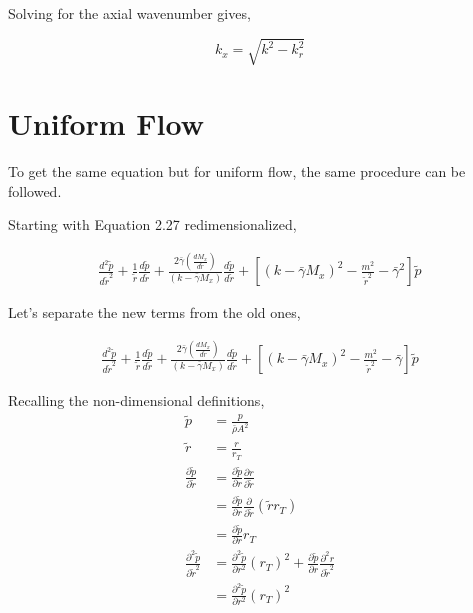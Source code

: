 \documentclass[a4paper]{article}
\begin{document}
Solving for the axial wavenumber gives,

\begin{equation}
    k_x = \sqrt{k^2 - k_r^2}
    \label{eqn:axial_wavenumber_equation}
\end{equation}

\section{Uniform Flow}

To get the same equation but for uniform flow, the same procedure can be followed.

Starting with Equation 2.27 redimensionalized, 

\begin{align*}
    \frac{ d^2 \tilde{p}}{d \tilde{r}^2} +
    \frac{1}{\tilde{r}} 
    \frac{d \tilde{p}}{d \tilde{r}} + 
    \frac{2 \bar{\gamma} \left( \frac{d M_x}{d \tilde{r}} \right)}
    {\left( k - \bar{\gamma} M_x \right)}\frac{d \tilde{p}}{d \tilde{r}}+
    \left[ \left( k - \bar{\gamma} M_x \right)^2 - \frac{m^2}{\tilde{r}^2}- 
    \bar{\gamma}^2 \right] \tilde{p}
\end{align*}

Let's separate the new terms from the old ones, 

\begin{align*}
    \frac{ d^2 \tilde{p}}{d \tilde{r}^2} +
    \frac{1}{\tilde{r}} 
    \frac{d \tilde{p}}{d \tilde{r}} + 
    \frac{2 \bar{\gamma} \left( \frac{d M_x}{d \tilde{r}} \right)}
    {\left( k - \bar{\gamma} M_x \right)}\frac{d \tilde{p}}{d \tilde{r}}+
    \left[ \left( k - \bar{\gamma} M_x \right)^2 - \frac{m^2}{\tilde{r}^2}- 
    \bar{\gamma} \right] \tilde{p}
\end{align*}


Recalling the non-dimensional definitions,
\begin{align*}
    \tilde{p} &= \frac{p}{\bar{\rho} A^2} \\
    \tilde{r} &= \frac{r}{r_T} \\
    \frac{\partial \tilde{p}}{\partial \tilde{r}} &= 
    \frac{ \partial \tilde{p}}{\partial r} \frac{\partial r}{ \partial \tilde{r}}  \\ 
    &= \frac{ \partial \tilde{p}}{\partial r} \frac{\partial }{ \partial \tilde{r}} \left( \tilde{r} r_T \right) \\
    &= 
    \frac{ \partial \tilde{p}}{\partial r}  r_T \\
    \frac{\partial^2 \tilde{p}}{\partial \tilde{r}^2} &= 
    \frac{ \partial^2 \tilde{p}}{\partial r^2}  (r_T)^2+ 
    \frac{ \partial \tilde{p}}{\partial r} \frac{\partial^2 r}{ \partial \tilde{r}^2} \\
    &= \frac{ \partial^2 \tilde{p}}{\partial r^2}  (r_T)^2 
\end{align*}
\end{document}
